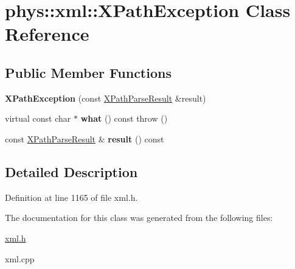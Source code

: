 \hypertarget{classphys_1_1xml_1_1XPathException}{
\section{phys::xml::XPathException Class Reference}
\label{d4/d30/classphys_1_1xml_1_1XPathException}
}
\subsection*{Public Member Functions}
\begin{DoxyCompactItemize}
\item 
\hypertarget{classphys_1_1xml_1_1XPathException_a2c326bac98d78d0816310bfac6c3b68f}{
{\bfseries XPathException} (const \hyperlink{structphys_1_1xml_1_1XPathParseResult}{XPathParseResult} \&result)}
\label{d4/d30/classphys_1_1xml_1_1XPathException_a2c326bac98d78d0816310bfac6c3b68f}

\item 
\hypertarget{classphys_1_1xml_1_1XPathException_a36e9d9daa5c8e2680057b2e1642ed225}{
virtual const char $\ast$ {\bfseries what} () const   throw ()}
\label{d4/d30/classphys_1_1xml_1_1XPathException_a36e9d9daa5c8e2680057b2e1642ed225}

\item 
\hypertarget{classphys_1_1xml_1_1XPathException_a37af29b6a83c06c8f2bf89eace7704fd}{
const \hyperlink{structphys_1_1xml_1_1XPathParseResult}{XPathParseResult} \& {\bfseries result} () const }
\label{d4/d30/classphys_1_1xml_1_1XPathException_a37af29b6a83c06c8f2bf89eace7704fd}

\end{DoxyCompactItemize}


\subsection{Detailed Description}


Definition at line 1165 of file xml.h.



The documentation for this class was generated from the following files:\begin{DoxyCompactItemize}
\item 
\hyperlink{xml_8h}{xml.h}\item 
xml.cpp\end{DoxyCompactItemize}
